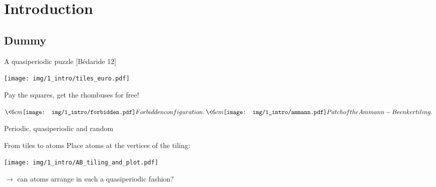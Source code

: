 \section{Introduction}
\subsection{Dummy}

\begin{frame}{A quasiperiodic puzzle [Bédaride \etal{} 12]}

\centering
\texttt{[image: img/1\_intro/tiles\_euro.pdf]}

Pay the squares, get the rhombuses for free!

\(
\<{6cm}
\centering
\texttt{[image: img/1\_intro/forbidden.pdf]}

Forbidden configuration.
\>

\<{6cm}
\centering
\texttt{[image: img/1\_intro/ammann.pdf]}

Patch of the Ammann-Beenker tiling.
\>
\)
\end{frame}

\begin{frame}{Periodic, quasiperiodic and random}
\centering
{}


\end{frame}

\begin{frame}{From tiles to atoms}
Place atoms at the vertices of the tiling:

{\centering
\texttt{[image: img/1\_intro/AB\_tiling\_and\_plot.pdf]}

}

$\rightarrow$ can atoms arrange in such a quasiperiodic fashion?
\end{frame}

